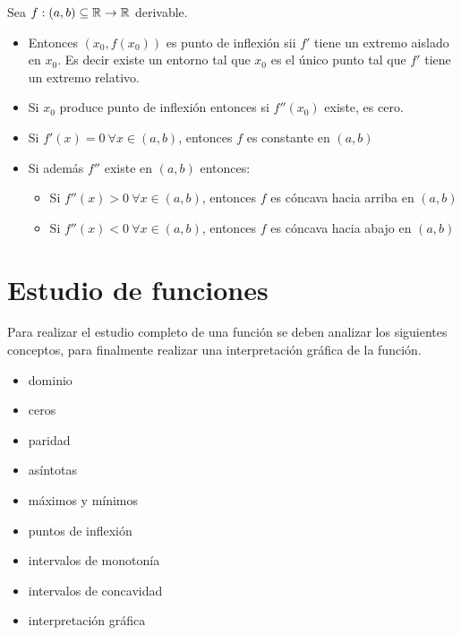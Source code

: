 \begin{observation}[Inflexión]
Sea $f : (a,b) \subseteq \mathbb{R} \to \mathbb{R}$ derivable.  

\begin{itemize}
\item Entonces $(x_0,f(x_0))$ es punto de inflexión sii $f'$ tiene un extremo aislado en $x_0$.  Es decir existe un entorno tal que $x_0$ es el único punto tal que $f'$ tiene un extremo relativo.
\item Si $x_0$ produce punto de inflexión entonces si $f''(x_0)$ existe, es cero.
\item Si $f'(x) = 0 \ \forall x \in (a,b)$, entonces $f$ es constante en $(a,b)$
\item Si además $f''$ existe en $(a,b)$ entonces:

\begin{itemize}
\item \subitem Si $f''(x) > 0 \ \forall x \in (a,b)$, entonces $f$ es cóncava hacia arriba en $(a,b)$
\item \subitem Si $f''(x) < 0 \ \forall x \in (a,b)$, entonces $f$ es cóncava hacia abajo en $(a,b)$
\end{itemize}
\end{itemize}
\end{observation}

\section{Estudio de funciones}

Para realizar el estudio completo de una función se deben analizar los siguientes conceptos, para finalmente realizar una interpretación gráfica de la función.

\begin{itemize}
\item dominio
\item ceros
\item paridad
\item asíntotas
\item máximos y mínimos
\item puntos de inflexión 
\item intervalos de monotonía
\item intervalos de concavidad 
\item interpretación gráfica
\end{itemize}




